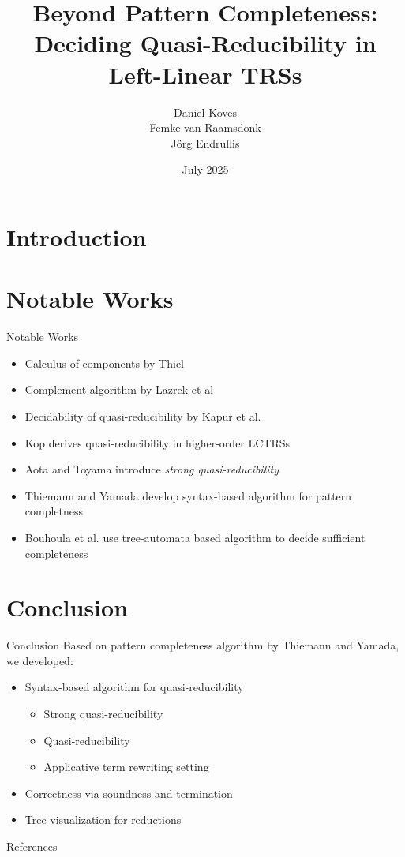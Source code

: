 \documentclass[onlytextwidth]{beamer}
\title{Beyond Pattern Completeness:\\ Deciding Quasi-Reducibility in Left-Linear TRSs}
\author[Daniel Koves]{
    Daniel Koves\\
    \vspace*{0.3cm}
    \scriptsize{Femke van Raamsdonk}\\
    \scriptsize{Jörg Endrullis}
}
\institute{Vrije Universiteit Amsterdam}
\date{July 2025}
\begin{document}
\frame{\titlepage}

\section{Introduction}




\section{Notable Works}
\begin{frame}{Notable Works}
    \begin{itemize}
        \item Calculus of components by Thiel
        \item Complement algorithm by Lazrek et al
        \item Decidability of quasi-reducibility by Kapur et al.
        \item Kop derives quasi-reducibility in higher-order LCTRSs
        \item Aota and Toyama introduce \textit{strong quasi-reducibility}
        \item Thiemann and Yamada develop syntax-based algorithm for pattern completness
        \item Bouhoula et al. use tree-automata based algorithm to decide sufficient completeness
    \end{itemize}
\end{frame}

\section{Conclusion}
\begin{frame}{Conclusion}
Based on pattern completeness algorithm by Thiemann and Yamada, we developed:

    \begin{itemize}
        \item Syntax-based algorithm for quasi-reducibility
        \begin{itemize}
            \item Strong quasi-reducibility
            \item Quasi-reducibility
            \item Applicative term rewriting setting
        \end{itemize}
        \item Correctness via soundness and termination
        \item Tree visualization for reductions
    \end{itemize}
\end{frame}


\begin{frame}[allowframebreaks]{References}
\nocite{*}
\renewcommand*{\bibfont}{\scriptsize}
\printbibliography
\end{frame}
\end{document}
